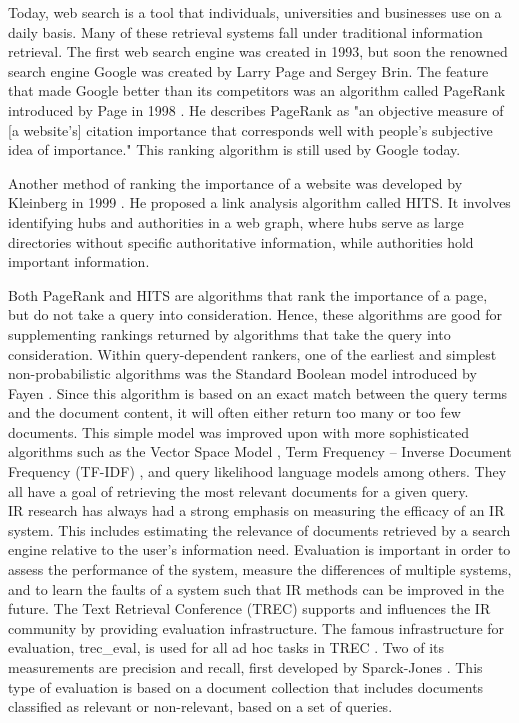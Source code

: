 Today, web search is a tool that individuals, universities and businesses use on a daily basis. Many of these retrieval systems fall under traditional information retrieval. The first web search engine was created in 1993, but soon the renowned search engine Google was created by Larry Page and Sergey Brin. The feature that made Google better than its competitors was an algorithm called PageRank introduced by Page in 1998 \cite{brin1998anatomy}. He describes PageRank as "an objective measure of [a website's] citation importance that corresponds well with people's subjective idea of importance." This ranking algorithm is still used by Google today.

Another method of ranking the importance of a website was developed by Kleinberg in 1999 \cite{kleinberg1999authoritative}. He proposed a link analysis algorithm called HITS. It involves identifying hubs and authorities in a web graph, where hubs serve as large directories without specific authoritative information, while authorities hold important information. %

Both PageRank and HITS are algorithms that rank the importance of a page, but do not take a query into consideration. Hence, these algorithms are good for supplementing rankings returned by algorithms that take the query into consideration. Within query-dependent rankers, one of the earliest and simplest non-probabilistic algorithms was the Standard Boolean model introduced by Fayen \cite{lancaster1973information}. Since this algorithm is based on an exact match between the query terms and the document content, it will often either return too many or too few documents. This simple model was improved upon with more sophisticated algorithms such as the Vector Space Model \cite{salton1975vector}, Term Frequency -- Inverse Document Frequency (TF-IDF) \cite{salton1983mcgill}, and query likelihood language models \cite{zhai2001model} among others. They all have a goal of retrieving the most relevant documents for a given query. \\

IR research has always had a strong emphasis on measuring the efficacy of an IR system. This includes estimating the relevance of documents retrieved by a search engine relative to the user's information need. Evaluation is important in order to assess the performance of the system, measure the differences of multiple systems, and to learn the faults of a system such that IR methods can be improved in the future. The Text Retrieval Conference (TREC) supports and influences the IR community by providing evaluation infrastructure. The famous infrastructure for evaluation, trec\_eval, is used for all ad hoc tasks in TREC \cite{voorhees:evaluation}. Two of its measurements are precision and recall, first developed by Sparck-Jones \cite{jones1981information}. This type of evaluation is based on a document collection that includes documents classified as relevant or non-relevant, based on a set of queries.

